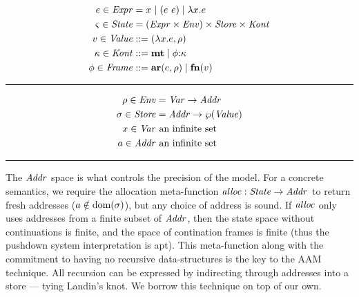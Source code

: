 \begin{minipage}[b]{.55\linewidth}
  \begin{align*}
  e \in \mathit{Expr} &= x^{{}} \mid (e\ e){} \mid \lambda{} x. e \\
  \varsigma \in \mathit{State} &= (\mathit{Expr} \times \mathit{Env}) \times \mathit{Store} \times \mathit{Kont} \\
  v \in \mathit{Value} &::= (\lambda{} x. e, \rho) \\
  \kappa \in \mathit{Kont} &::= \mathbf{mt} \mid \phi{\tt :} \kappa \\
  \phi \in \mathit{Frame} &::= \mathbf{ar}{}(e,\rho) \mid \mathbf{fn}{}(v)
  \end{align*}\hrule height 0pt\end{minipage}
\begin{minipage}[b]{.40\linewidth}
  \begin{align*}
  \rho \in \mathit{Env} &= \mathit{Var} \to \mathit{Addr} \\
  \sigma \in \mathit{Store} &= \mathit{Addr} \to \wp(\mathit{Value}) \\
  x \in \mathit{Var} &\text{ an infinite set} \\
  a \in \mathit{Addr} &\text{ an infinite set}
  \end{align*}\hrule height 0pt\end{minipage}

The $\mathit{Addr}$ space is what controls the precision of the model.
%
For a concrete semantics, we require the allocation meta-function $\mathit{alloc} :
\mathit{State} \to \mathit{Addr}$ to return fresh addresses ($a \notin \text{dom}(\sigma)$), but any choice of address is sound.
%
If $\mathit{alloc}$ only uses addresses from a finite subset of $\mathit{Addr}$, then the state space without continuations is finite, and the space of contination frames is finite (thus the pushdown system interpretation is apt).
%
This meta-function along with the commitment to having no recursive data-structures is the key to the AAM technique.
%
All recursion can be expressed by indirecting through addresses into a store --- tying Landin's knot.
%
We borrow this technique on top of our own.

